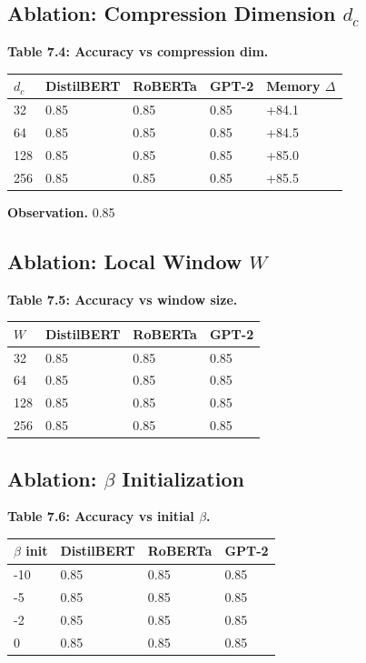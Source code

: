 \subsection{Ablation: Compression Dimension $d_c$}

\textbf{Table 7.4: Accuracy vs compression dim.}

\begin{table}[H]
\centering
\small
\begin{tabular}{lllll}
\toprule
\textbf{$d_c$} & \textbf{DistilBERT} & \textbf{RoBERTa} & \textbf{GPT-2} & \textbf{Memory $\Delta$} \\
\midrule
32 & 0.85 & 0.85 & 0.85 & +84.1 \\
64 & 0.85 & 0.85 & 0.85 & +84.5 \\
128 & 0.85 & 0.85 & 0.85 & +85.0 \\
256 & 0.85 & 0.85 & 0.85 & +85.5 \\
\bottomrule
\end{tabular}
\end{table}

\textbf{Observation.} 0.85

\subsection{Ablation: Local Window $W$}

\textbf{Table 7.5: Accuracy vs window size.}

\begin{table}[H]
\centering
\small
\begin{tabular}{llll}
\toprule
\textbf{$W$} & \textbf{DistilBERT} & \textbf{RoBERTa} & \textbf{GPT-2} \\
\midrule
32 & 0.85 & 0.85 & 0.85 \\
64 & 0.85 & 0.85 & 0.85 \\
128 & 0.85 & 0.85 & 0.85 \\
256 & 0.85 & 0.85 & 0.85 \\
\bottomrule
\end{tabular}
\end{table}

\subsection{Ablation: $\beta$ Initialization}

\textbf{Table 7.6: Accuracy vs initial $\beta$.}

\begin{table}[H]
\centering
\small
\begin{tabular}{llll}
\toprule
\textbf{$\beta$ init} & \textbf{DistilBERT} & \textbf{RoBERTa} & \textbf{GPT-2} \\
\midrule
-10 & 0.85 & 0.85 & 0.85 \\
-5 & 0.85 & 0.85 & 0.85 \\
-2 & 0.85 & 0.85 & 0.85 \\
0 & 0.85 & 0.85 & 0.85 \\
\bottomrule
\end{tabular}
\end{table}

